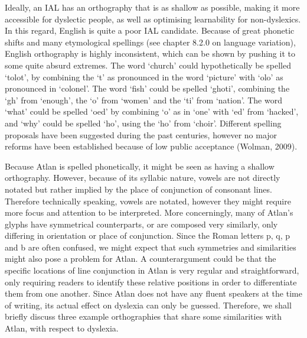 Ideally, an IAL has an orthography that is as shallow as possible, making it more accessible for dyslectic people, as well as optimising learnability for non-dyslexics. In this regard, English is quite a poor IAL candidate. Because of great phonetic shifts and many etymological spellings (see chapter 8.2.0 on language variation), English orthography is highly inconsistent, which can be shown by pushing it to some quite absurd extremes. The word ‘church’ could hypothetically be spelled ‘tolot’, by combining the ‘t’ as pronounced in the word ‘picture’ with ‘olo’ as pronounced in ‘colonel’. The word ‘fish’ could be spelled ‘ghoti’, combining the ‘gh’ from ‘enough’, the ‘o’ from ‘women’ and the ‘ti’ from ‘nation’. The word ‘what’ could be spelled ‘oed’ by combining ‘o’ as in ‘one’ with ‘ed’ from ‘hacked’, and ‘why’ could be spelled ‘ho’, using the ‘ho’ from ‘choir’. Different spelling proposals have been suggested during the past centuries, however no major reforms have been established because of low public acceptance (Wolman, 2009). 

Because Atlan is spelled phonetically, it might be seen as having a shallow orthography. However, because of its syllabic nature, vowels are not directly notated but rather implied by the place of conjunction of consonant lines. Therefore technically speaking, vowels are notated, however they might require more focus and attention to be interpreted. More concerningly, many of Atlan’s glyphs have symmetrical counterparts, or are composed very similarly, only differing in orientation or place of conjunction. Since the Roman letters p, q, p and b are often confused, we might expect that such symmetries and similarities might also pose a problem for Atlan. A counterargument could be that the specific locations of line conjunction in Atlan is very regular and straightforward, only requiring readers to identify these relative positions in order to differentiate them from one another. Since Atlan does not have any fluent speakers at the time of writing, its actual effect on dyslexia can only be guessed. Therefore, we shall briefly discuss three example orthographies that share some similarities with Atlan, with respect to dyslexia. 

\def\isy#1{\scalerel*{\texttt{[image: ./Images/\#1.jpg]}}{X}}

